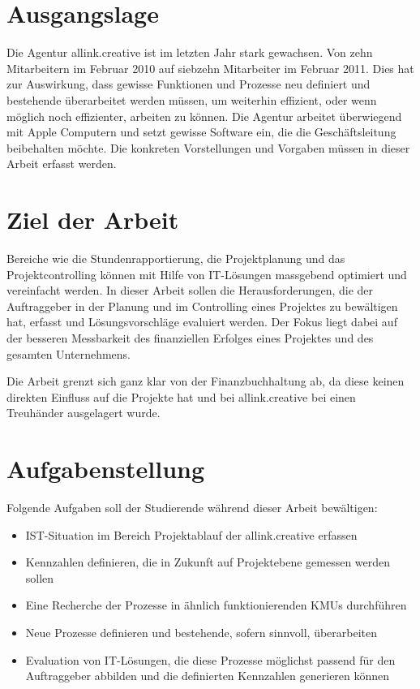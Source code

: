 \section{Ausgangslage}
Die Agentur allink.creative ist im letzten Jahr stark gewachsen. Von zehn
Mitarbeitern im Februar 2010 auf siebzehn Mitarbeiter im Februar 2011. Dies hat 
zur Auswirkung, dass gewisse Funktionen und Prozesse neu definiert und bestehende
überarbeitet werden müssen, um weiterhin effizient, oder wenn möglich noch 
effizienter, arbeiten zu können. Die Agentur arbeitet überwiegend mit Apple
Computern und setzt gewisse Software ein, die die Geschäftsleitung beibehalten 
möchte. Die konkreten Vorstellungen und Vorgaben müssen in dieser Arbeit erfasst 
werden.

\section{Ziel der Arbeit}
Bereiche wie die Stundenrapportierung, die Projektplanung und das Projektcontrolling 
können mit Hilfe von IT-Lösungen massgebend optimiert und vereinfacht werden. 
In dieser Arbeit sollen die Herausforderungen, die der Auftraggeber in der 
Planung und im Controlling eines Projektes zu bewältigen hat, erfasst und 
Lösungsvorschläge evaluiert werden. Der Fokus liegt dabei auf der besseren 
Messbarkeit des finanziellen Erfolges eines Projektes und des gesamten 
Unternehmens.

Die Arbeit grenzt sich ganz klar von der Finanzbuchhaltung ab, da
diese keinen direkten Einfluss auf die Projekte hat und bei allink.creative 
bei einen Treuhänder ausgelagert wurde.

\section{Aufgabenstellung}
Folgende Aufgaben soll der Studierende während dieser Arbeit bewältigen:

\begin{itemize}
    \item IST-Situation im Bereich Projektablauf der allink.creative erfassen
    \item Kennzahlen definieren, die in Zukunft auf Projektebene gemessen 
        werden sollen
    \item Eine Recherche der Prozesse in ähnlich funktionierenden KMUs durchführen
    \item Neue Prozesse definieren und bestehende, sofern sinnvoll, überarbeiten
    \item Evaluation von IT-Lösungen, die diese Prozesse möglichst passend 
        für den Auftraggeber abbilden und die definierten Kennzahlen generieren können
\end{itemize}

